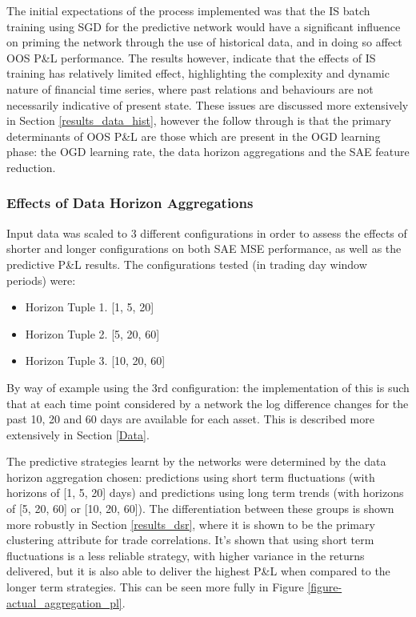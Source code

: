 \documentclass[a4paper,11pt,oneside]{article}
\theoremstyle{plain}
\theoremstyle{definition}
\begin{document}
	The initial expectations of the process implemented was that the IS batch training using SGD for the predictive network would have a significant influence on priming the network through the use of historical data, and in doing so affect OOS P\&L performance. The results however, indicate that the effects of IS training has relatively limited effect, highlighting the complexity and dynamic nature of financial time series, where past relations and behaviours are not necessarily indicative of present state. These issues are discussed more extensively in Section \ref{results_data_hist}, however the follow through is that the primary determinants of OOS P\&L are those which are present in the OGD learning phase: the OGD learning rate, the data horizon aggregations and the SAE feature reduction.\newline
	
	
	\subsubsection{Effects of Data Horizon Aggregations}
	
	Input data was scaled to 3 different configurations in order to assess the effects of shorter and longer configurations on both SAE MSE performance, as well as the predictive P\&L results. The configurations tested (in trading day window periods) were:
	
	\begin{itemize}
		\item[] Horizon Tuple 1. [1, 5, 20]
		\item[] Horizon Tuple 2. [5, 20, 60]
		\item[] Horizon Tuple 3. [10, 20, 60]
	\end{itemize}
	
	By way of example using the 3rd configuration: the implementation of this is such that at each time point considered by a network the log difference changes for the past 10, 20 and 60 days are available for each asset. This is described more extensively in Section \ref{Data}.\newline
	
	The predictive strategies learnt by the networks were determined by the data horizon aggregation chosen: predictions using short term fluctuations (with horizons of [1, 5, 20] days) and predictions using long term trends (with horizons of [5, 20, 60] or [10, 20, 60]). The differentiation between these groups is shown more robustly in Section \ref{results_dsr}, where it is shown to be the primary clustering attribute for trade correlations. It's shown that using short term fluctuations is a less reliable strategy, with higher variance in the returns delivered, but it is also able to deliver the highest P\&L when compared to the longer term strategies. This can be seen more fully in Figure \ref{figure-actual_aggregation_pl}. \newline
\end{document}
